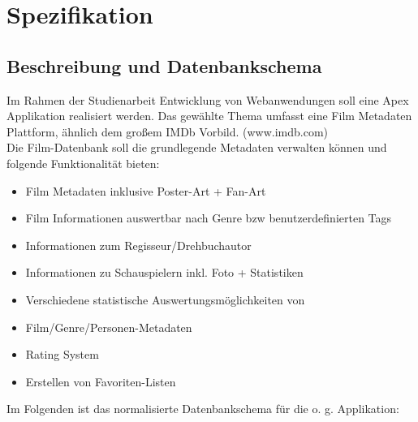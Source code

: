 \documentclass[11pt]{scrreprt}
\begin{document}

\tableofcontents

\chapter{Spezifikation}
\section{Beschreibung und Datenbankschema}
Im Rahmen der Studienarbeit Entwicklung von Webanwendungen soll eine Apex
Applikation realisiert werden. Das gewählte Thema umfasst eine Film Metadaten
Plattform, ähnlich dem großem IMDb Vorbild. (www.imdb.com) 
\\
Die Film-Datenbank soll die grundlegende Metadaten verwalten können und folgende
Funktionalität bieten:

\begin{itemize}
\item Film Metadaten inklusive Poster-Art + Fan-Art
\item Film Informationen auswertbar nach Genre bzw benutzerdefinierten Tags
\item Informationen zum Regisseur/Drehbuchautor
\item Informationen zu Schauspielern inkl. Foto + Statistiken
\item Verschiedene statistische Auswertungsmöglichkeiten von
\item Film/Genre/Personen-Metadaten
\item Rating System
\item Erstellen von Favoriten-Listen
\end{itemize}
 

Im Folgenden ist das normalisierte Datenbankschema für die o. g. Applikation:
\end{document}
